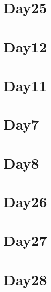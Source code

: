 
\section*{Day25}

\vfill
\section*{Day12}

\vfill
\section*{Day11}

\vfill
\section*{Day7}

\vfill
\section*{Day8}

\vfill
\section*{Day26}

\vfill
\section*{Day27}

\vfill
\section*{Day28}

\vfill
